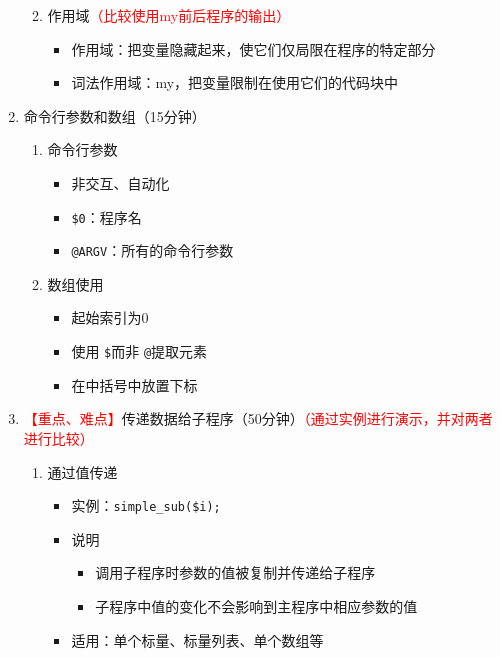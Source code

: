 \documentclass{TIJMUjiaoanLL}
\begin{document}
\begin{enumerate}
\begin{enumerate}
\begin{itemize}
	\end{itemize}
      \item 作用域\textcolor{red}{（比较使用my前后程序的输出）}
	\begin{itemize}
	  \item 作用域：把变量隐藏起来，使它们仅局限在程序的特定部分
	  \item 词法作用域：my，把变量限制在使用它们的代码块中
	\end{itemize}
    \end{enumerate}
  \item 命令行参数和数组（15分钟）
\vspace*{-1em}
\begin{multicols}{2}
    \begin{enumerate}
      \item 命令行参数
	\begin{itemize}
	  \item 非交互、自动化
	  \item \verb|$0|：程序名
	  \item \verb|@ARGV|：所有的命令行参数
	\end{itemize}
      \item 数组使用
	\begin{itemize}
	  \item 起始索引为0
	  \item 使用 \verb|$|而非 \verb|@|提取元素
	  \item 在中括号中放置下标
	\end{itemize}
    \end{enumerate}
\end{multicols}
\vspace*{-1em}
  \item \textcolor{red}{【重点、难点】}传递数据给子程序（50分钟）\textcolor{red}{（通过实例进行演示，并对两者进行比较）}
    \begin{enumerate}
      \item 通过值传递
	\begin{itemize}
	  \item 实例：\verb|simple_sub($i);|
	  \item 说明
	    \begin{itemize}
	      \item 调用子程序时参数的值被复制并传递给子程序
	      \item 子程序中值的变化不会影响到主程序中相应参数的值
	    \end{itemize}
	  \item 适用：单个标量、标量列表、单个数组等

\end{itemize}
\end{enumerate}
\end{enumerate}
\end{document}
